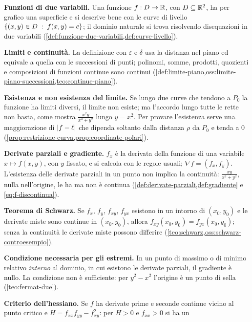 \begin{puntichiave}
\item \textbf{Funzioni di due variabili.} Una funzione $f:D\to\mathbb{R}$, con
$D\subseteq\mathbb{R}^{2}$, ha per grafico una superficie e si descrive bene con le curve di
livello $\left\{ (x,y)\in D \;:\; f(x,y)=c \right\}$; il dominio naturale si trova risolvendo
disequazioni in due variabili (\cref{def:funzione-due-variabili,def:curve-livello}).
\item \textbf{Limiti e continuità.} La definizione con $\varepsilon$ e $\delta$ usa la
distanza nel piano ed equivale a quella con le successioni di punti; polinomi, somme,
prodotti, quozienti e composizioni di funzioni continue sono continui
(\cref{def:limite-piano,oss:limite-piano-successioni,teo:continue-piano}).
\item \textbf{Esistenza e non esistenza del limite.} Se lungo due curve che tendono a
$P_{0}$ la funzione ha limiti diversi, il limite non esiste; ma l'accordo lungo tutte le
rette non basta, come mostra $\frac{x^{2}y}{x^{4}+y^{2}}$ lungo $y=x^{2}$. Per provare
l'esistenza serve una maggiorazione di $\lvert f-\ell\rvert$ che dipenda soltanto dalla
distanza $\rho$ da $P_{0}$ e tenda a $0$
(\cref{prop:restrizione-curva,prop:coordinate-polari}).
\item \textbf{Derivate parziali e gradiente.} $f_{x}$ è la derivata della funzione di
una variabile $x\mapsto f(x,y)$, con $y$ fissato, e si calcola con le regole usuali;
$\nabla f=(f_{x},f_{y})$. L'esistenza delle derivate parziali in un punto non implica la
continuità: $\frac{xy}{x^{2}+y^{2}}$, nulla nell'origine, le ha ma non è continua
(\cref{def:derivate-parziali,def:gradiente} e \eqref{eq:f-discontinua}).
\item \textbf{Teorema di Schwarz.} Se $f_{x}$, $f_{y}$, $f_{xy}$, $f_{yx}$ esistono in un
intorno di $(x_{0},y_{0})$ e le derivate miste sono continue in $(x_{0},y_{0})$, allora
$f_{xy}(x_{0},y_{0})=f_{yx}(x_{0},y_{0})$; senza la continuità le derivate miste possono
differire (\cref{teo:schwarz,oss:schwarz-controesempio}).
\item \textbf{Condizione necessaria per gli estremi.} In un punto di massimo o di minimo
relativo \emph{interno} al dominio, in cui esistono le derivate parziali, il gradiente
è nullo. La condizione non è sufficiente: per $y^{2}-x^{2}$ l'origine è un punto di
sella (\cref{teo:fermat-due}).
\item \textbf{Criterio dell'hessiano.} Se $f$ ha derivate prime e seconde continue
vicino al punto critico e $H=f_{xx}f_{yy}-f_{xy}^{2}$: per $H>0$ e $f_{xx}>0$ si ha un

\end{puntichiave}
